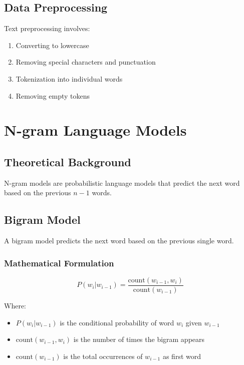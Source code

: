 \documentclass[12pt,a4paper]{report}
\begin{document}
\section{Data Preprocessing}

Text preprocessing involves:
\begin{enumerate}
    \item Converting to lowercase
    \item Removing special characters and punctuation
    \item Tokenization into individual words
    \item Removing empty tokens
\end{enumerate}

\newpage

\chapter{N-gram Language Models}

\section{Theoretical Background}

N-gram models are probabilistic language models that predict the next word based on the previous $n-1$ words.

\section{Bigram Model}

A bigram model predicts the next word based on the previous single word.

\subsection{Mathematical Formulation}

\begin{equation}
P(w_i | w_{i-1}) = \frac{\text{count}(w_{i-1}, w_i)}{\text{count}(w_{i-1})}
\end{equation}

Where:
\begin{itemize}
    \item $P(w_i | w_{i-1})$ is the conditional probability of word $w_i$ given $w_{i-1}$
    \item $\text{count}(w_{i-1}, w_i)$ is the number of times the bigram appears
    \item $\text{count}(w_{i-1})$ is the total occurrences of $w_{i-1}$ as first word
\end{itemize}
\end{document}

